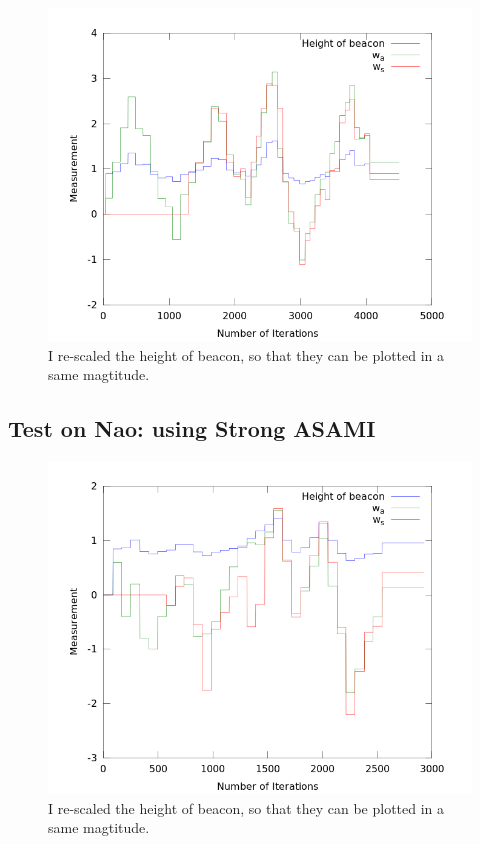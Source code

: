 \documentclass[10pt]{IEEEtran}
\begin{document}
\begin{figure}
\centering
\includegraphics[width=\columnwidth]{out_obs.png}
\caption{I re-scaled the height of beacon, so that they can be
plotted in a same magtitude.}
\label{fig:obs}
\end{figure}

\subsection{Test on Nao: using Strong ASAMI}

\begin{figure}
\centering
\includegraphics[width=\columnwidth]{out_strong.png}
\caption{I re-scaled the height of beacon, so that they can be
plotted in a same magtitude.}
\label{fig:obs_strong}
\end{figure}
\end{document}
